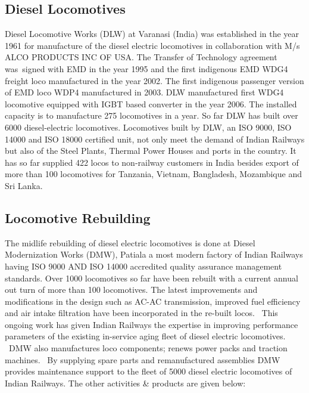 \subsection{Diesel Locomotives}

Diesel Locomotive Works (DLW) at Varanasi (India) was established in the year 1961 for manufacture of the diesel
electric locomotives in collaboration with M/s ALCO PRODUCTS INC OF USA. The Transfer of Technology agreement
was~signed with EMD in the year 1995 and the first indigenous EMD WDG4 freight loco manufactured in the year 2002. The
first indigenous passenger version of EMD loco WDP4 manufactured in 2003. DLW manufactured first WDG4 locomotive
equipped with IGBT based converter in the year 2006. The installed capacity is to manufacture 275 locomotives in a
year. So far DLW has built over 6000 diesel-electric locomotives. Locomotives built by DLW, an ISO 9000, ISO 14000 and
ISO 18000 certified unit, not only meet the demand of Indian Railways but also of the Steel Plants, Thermal Power
Houses and ports in the country. It has so far supplied 422 locos to non-railway customers in India besides export of
more than 100 locomotives for Tanzania, Vietnam, Bangladesh, Mozambique and Sri Lanka.



\subsection{Locomotive Rebuilding}

The midlife rebuilding of diesel electric locomotives is done at Diesel Modernization Works (DMW), Patiala a most modern
factory of Indian Railways having ISO 9000 AND ISO 14000 accredited quality assurance management standards. Over 1000
locomotives so far have been rebuilt with a current annual out turn of more than 100 locomotives. The latest
improvements and modifications in the design such as AC-AC transmission, improved fuel efficiency and air intake
filtration have been incorporated in the re-built locos. \ This ongoing work has given Indian Railways the expertise in
improving performance parameters of the existing in-service aging fleet of diesel electric locomotives. \ DMW also
manufactures loco components; renews power packs and traction machines. \ By supplying spare parts and remanufactured
assemblies DMW provides maintenance support to the fleet of 5000 diesel electric locomotives of Indian Railways. The
other activities \& products are given below:


\bigskip

